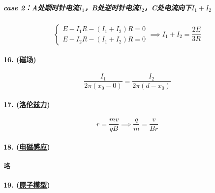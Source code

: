 \subparagraph{case 2：A处顺时针电流$I_1$，B处逆时针电流$I_2$，C处电流向下$I_1+I_2$}
\begin{equation*}
    \begin{cases}
        E-I_1R-(I_1+I_2)R=0\\
        E-I_2R-(I_1+I_2)R=0
    \end{cases}\implies I_1+I_2=\frac{2E}{3R}
\end{equation*}

\paragraph{16. (\hyperref[subsec:磁场]{磁场})}

\begin{equation*}
    \frac{I_1}{2\pi(x_0-0)}=\frac{I_2}{2\pi(d-x_0)}
\end{equation*}

\paragraph{17. (\hyperref[subsec:洛伦兹力]{洛伦兹力})}

\begin{equation*}
    r=\frac{mv}{qB}\implies\frac{q}{m}=\frac{v}{Br}
\end{equation*}

\paragraph{18. (\hyperref[subsec:电磁感应]{电磁感应})} 略

\paragraph{19. (\hyperref[sec:原子模型]{原子模型})}

\begin{center}
\end{center}
